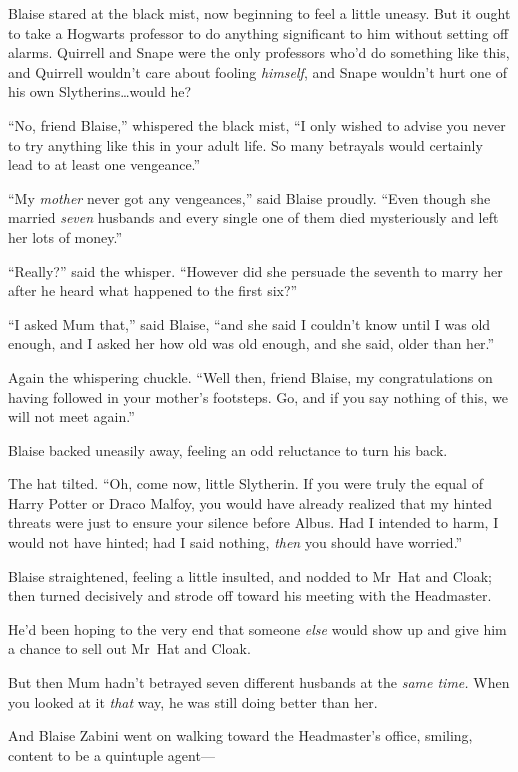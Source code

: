 Blaise stared at the black mist, now beginning to feel a little uneasy. But it ought to take a Hogwarts professor to do anything significant to him without setting off alarms. Quirrell and Snape were the only professors who’d do something like this, and Quirrell wouldn’t care about fooling \emph{himself}, and Snape wouldn’t hurt one of his own Slytherins…would he?

“No, friend Blaise,” whispered the black mist, “I only wished to advise you never to try anything like this in your adult life. So many betrayals would certainly lead to at least one vengeance.”

“My \emph{mother} never got any vengeances,” said Blaise proudly. “Even though she married \emph{seven} husbands and every single one of them died mysteriously and left her lots of money.”

“Really?” said the whisper. “However did she persuade the seventh to marry her after he heard what happened to the first six?”

“I asked Mum that,” said Blaise, “and she said I couldn’t know until I was old enough, and I asked her how old was old enough, and she said, older than her.”

Again the whispering chuckle. “Well then, friend Blaise, my congratulations on having followed in your mother’s footsteps. Go, and if you say nothing of this, we will not meet again.”

Blaise backed uneasily away, feeling an odd reluctance to turn his back.

The hat tilted. “Oh, come now, little Slytherin. If you were truly the equal of Harry Potter or Draco Malfoy, you would have already realized that my hinted threats were just to ensure your silence before Albus. Had I intended to harm, I would not have hinted; had I said nothing, \emph{then} you should have worried.”

Blaise straightened, feeling a little insulted, and nodded to Mr~Hat and Cloak; then turned decisively and strode off toward his meeting with the Headmaster.

He’d been hoping to the very end that someone \emph{else} would show up and give him a chance to sell out Mr~Hat and Cloak.

But then Mum hadn’t betrayed seven different husbands at the \emph{same time.} When you looked at it \emph{that} way, he was still doing better than her.

And Blaise Zabini went on walking toward the Headmaster’s office, smiling, content to be a quintuple agent—

